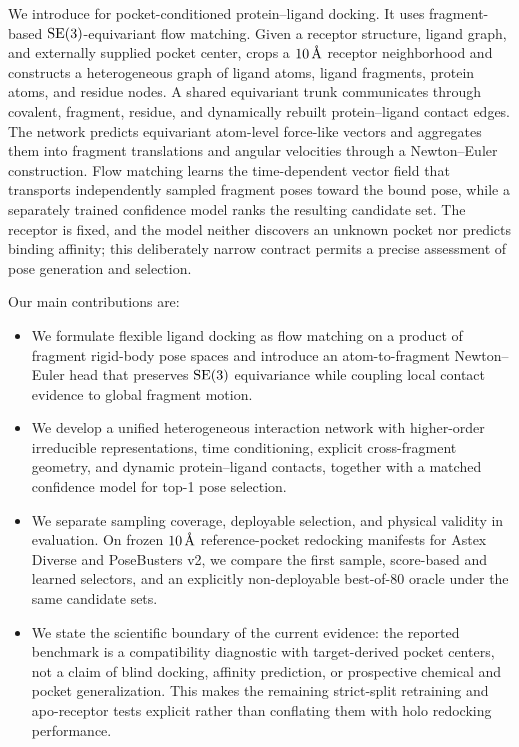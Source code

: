 We introduce \method for pocket-conditioned protein--ligand docking. It uses
fragment-based \(\mathrm{SE}(3)\)-equivariant flow matching. Given a receptor
structure, ligand graph, and externally supplied pocket center,
\method crops a \(10\,\text{\normalfont\AA}\) receptor neighborhood and constructs a
heterogeneous graph of ligand atoms, ligand fragments, protein atoms, and
residue nodes. A shared equivariant trunk communicates through covalent,
fragment, residue, and dynamically rebuilt protein--ligand contact edges. The
network predicts equivariant atom-level force-like vectors and aggregates them
into fragment translations and angular velocities through a Newton--Euler
construction. Flow matching learns the time-dependent vector field that
transports independently sampled fragment poses toward the bound pose, while a
separately trained confidence model ranks the resulting candidate set. The
receptor is fixed, and the model neither discovers an unknown pocket nor
predicts binding affinity; this deliberately narrow contract permits a precise
assessment of pose generation and selection.

Our main contributions are:
\begin{itemize}
    \item We formulate flexible ligand docking as flow matching on a product of
    fragment rigid-body pose spaces and introduce an atom-to-fragment
    Newton--Euler head that preserves \(\mathrm{SE}(3)\) equivariance while coupling
    local contact evidence to global fragment motion.

    \item We develop a unified heterogeneous interaction network with
    higher-order irreducible representations, time conditioning, explicit
    cross-fragment geometry, and dynamic protein--ligand contacts, together
    with a matched confidence model for top-1 pose selection.

    \item We separate sampling coverage, deployable selection, and physical
    validity in evaluation. On frozen \(10\,\text{\normalfont\AA}\) reference-pocket
    redocking manifests for Astex Diverse and PoseBusters v2, we
    compare the first sample, score-based and learned selectors, and an
    explicitly non-deployable best-of-80 oracle under the same candidate sets.

    \item We state the scientific boundary of the current evidence: the
    reported benchmark is a compatibility diagnostic with target-derived
    pocket centers, not a claim of blind docking, affinity prediction, or
    prospective chemical and pocket generalization. This makes the remaining
    strict-split retraining and apo-receptor tests explicit rather than
    conflating them with holo redocking performance.
\end{itemize}
